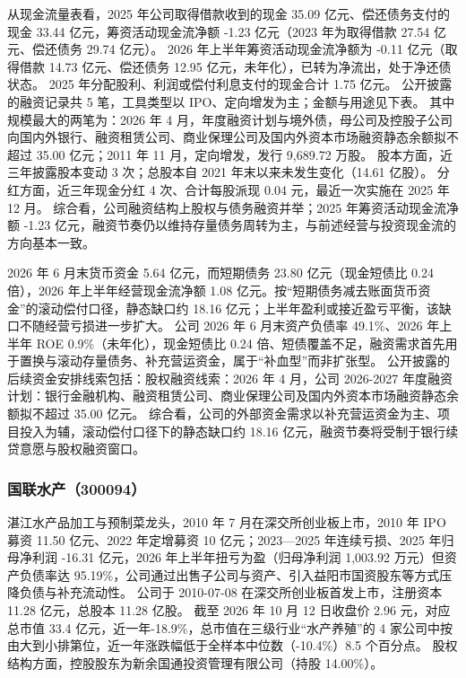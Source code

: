  从现金流量表看，2025 年公司取得借款收到的现金 35.09 亿元、偿还债务支付的现金 33.44 亿元，筹资活动现金流净额 -1.23 亿元（2023 年为取得借款 27.54 亿元、偿还债务 29.74 亿元）。 2026 年上半年筹资活动现金流净额为 -0.11 亿元（取得借款 14.73 亿元、偿还债务 12.95 亿元，未年化），已转为净流出，处于净还债状态。 2025 年分配股利、利润或偿付利息支付的现金合计 1.75 亿元。 公开披露的融资记录共 5 笔，工具类型以 IPO、定向增发为主；金额与用途见下表。 其中规模最大的两笔为：2026 年 4 月，年度融资计划与境外债，母公司及控股子公司向国内外银行、融资租赁公司、商业保理公司及国内外资本市场融资静态余额拟不超过 35.00 亿元；2011 年 11 月，定向增发，发行 9,689.72 万股。 股本方面，近三年披露股本变动 3 次；总股本自 2021 年末以来未发生变化（14.61 亿股）。 分红方面，近三年现金分红 4 次、合计每股派现 0.04 元，最近一次实施在 2025 年 12 月。 综合看，公司融资结构上股权与债务融资并举；2025 年筹资活动现金流净额 -1.23 亿元，融资节奏仍以维持存量债务周转为主，与前述经营与投资现金流的方向基本一致。

 2026 年 6 月末货币资金 5.64 亿元，而短期债务 23.80 亿元（现金短债比 0.24 倍），2026 年上半年经营现金流净额 1.08 亿元。按“短期债务减去账面货币资金”的滚动偿付口径，静态缺口约 18.16 亿元；上半年盈利或接近盈亏平衡，该缺口不随经营亏损进一步扩大。 公司 2026 年 6 月末资产负债率 49.1\%、2026 年上半年 ROE 0.9\%（未年化），现金短债比 0.24 倍、短债覆盖不足，融资需求首先用于置换与滚动存量债务、补充营运资金，属于“补血型”而非扩张型。 公开披露的后续资金安排线索包括：股权融资线索：2026 年 4 月，公司 2026-2027 年度融资计划：银行金融机构、融资租赁公司、商业保理公司及国内外资本市场融资静态余额拟不超过 35.00 亿元。 综合看，公司的外部资金需求以补充营运资金为主、项目投入为辅，滚动偿付口径下的静态缺口约 18.16 亿元，融资节奏将受制于银行续贷意愿与股权融资窗口。




\subsubsection{国联水产（300094）}
\label{co:300094}

 湛江水产品加工与预制菜龙头，2010 年 7 月在深交所创业板上市，2010 年 IPO 募资 11.50 亿元、2022 年定增募资 10 亿元；2023—2025 年连续亏损、2025 年归母净利润 -16.31 亿元，2026 年上半年扭亏为盈（归母净利润 1,003.92 万元）但资产负债率达 95.19\%，公司通过出售子公司与资产、引入益阳市国资股东等方式压降负债与补充流动性。 公司于 2010-07-08 在深交所创业板首发上市，注册资本 11.28 亿元，总股本 11.28 亿股。 截至 2026 年 10 月 12 日收盘价 2.96 元，对应总市值 33.4 亿元，近一年-18.9\%，总市值在三级行业“水产养殖”的 4 家公司中按由大到小排第位，近一年涨跌幅低于全样本中位数（-10.4\%）8.5 个百分点。 股权结构方面，控股股东为新余国通投资管理有限公司（持股 14.00\%）。

